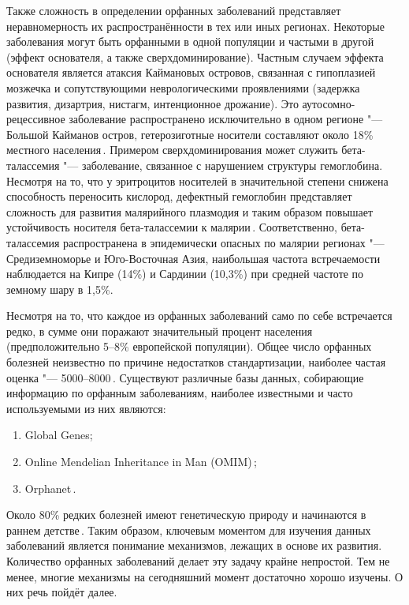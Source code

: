 \documentclass[a4paper,14pt]{extarticle}
\begin{document}
Также сложность в определении орфанных заболеваний представляет неравномерность их распространённости в тех или иных регионах.
Некоторые заболевания могут быть орфанными в одной популяции и частыми в другой (эффект основателя, а также сверхдоминирование).
Частным случаем эффекта основателя является атаксия Каймановых островов, связанная с гипоплазией мозжечка и сопутствующими неврологическими проявлениями (задержка развития, дизартрия, нистагм, интенционное дрожание).
Это аутосомно-рецессивное заболевание распространено исключительно в одном регионе "--- Большой Кайманов остров, гетерозиготные носители составляют около 18\% местного населения\,\cite{Bomar_2003}.
Примером сверхдоминирования может служить бета-талассемия "--- заболевание, связанное с нарушением структуры гемоглобина.
Несмотря на то, что у эритроцитов носителей в значительной степени снижена способность переносить кислород, дефектный гемоглобин представляет сложность для развития малярийного плазмодия и таким образом повышает устойчивость носителя бета-талассемии к малярии\,\cite{Galanello_2010}.
Соответственно, бета-талассемия распространена в эпидемически опасных по малярии регионах "--- Средиземноморье и Юго-Восточная Азия, наибольшая частота встречаемости наблюдается на Кипре (14\%) и Сардинии (10,3\%) при средней частоте по земному шару в 1,5\%.

Несмотря на то, что каждое из орфанных заболеваний само по себе встречается редко, в сумме они поражают значительный процент населения (предположительно 5--8\% европейской популяции).
Общее число орфанных болезней неизвестно по причине недостатков стандартизации, наиболее частая оценка "--- 5000--8000\,\cite{The_Lancet_Neurology_2011}.
Существуют различные базы данных, собирающие информацию по орфанным заболеваниям, наиболее известными и часто используемыми из них являются:

\begin{enumerate}
\item Global Genes;
\item Online Mendelian Inheritance in Man (OMIM\textregistered)\,\cite{Amberger_2014};
\item Orphanet\,\cite{Orphanet}.
\end{enumerate}

Около 80\% редких болезней имеют генетическую природу и начинаются в раннем детстве\,\cite{The_Lancet_Neurology_2011}.
Таким образом, ключевым моментом для изучения данных заболеваний является понимание механизмов, лежащих в основе их развития.
Количество орфанных заболеваний делает эту задачу крайне непростой.
Тем не менее, многие механизмы на сегодняшний момент достаточно хорошо изучены.
О них речь пойдёт далее.
\end{document}
